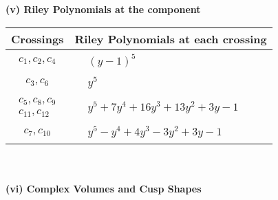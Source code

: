\documentclass[1p]{elsarticle_modified}
\theoremstyle{definition}
\begin{document}
\newpage\renewcommand{\arraystretch}{1}
\flushleft \textbf{(v) Riley Polynomials at the component}\newline \\
\begin{tabular}{m{50pt}|m{274pt}}
Crossings & \hspace{64pt}Riley Polynomials at each crossing \\
\hline $$\begin{aligned}c_{1},c_{2},c_{4}\end{aligned}$$&$\begin{aligned}
&(y-1)^5
\end{aligned}$\\
\hline $$\begin{aligned}c_{3},c_{6}\end{aligned}$$&$\begin{aligned}
&y^5
\end{aligned}$\\
\hline $$\begin{aligned}c_{5},c_{8},c_{9}\\c_{11},c_{12}\end{aligned}$$&$\begin{aligned}
&y^5+7 y^4+16 y^3+13 y^2+3 y-1
\end{aligned}$\\
\hline $$\begin{aligned}c_{7},c_{10}\end{aligned}$$&$\begin{aligned}
&y^5- y^4+4 y^3-3 y^2+3 y-1
\end{aligned}$\\
\hline
\end{tabular}\\~\\
\newpage\flushleft \textbf{(vi) Complex Volumes and Cusp Shapes}
\end{document}
